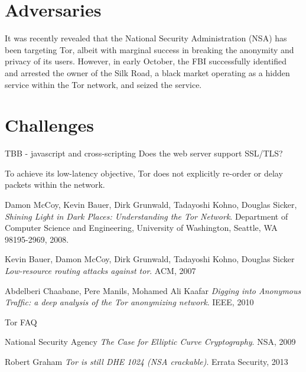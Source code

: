 \documentclass[journal]{IEEEtran}
\begin{document}

\section{Adversaries}

It was recently revealed that the National Security Administration (NSA) has been targeting Tor, albeit with marginal success in breaking the anonymity and privacy of its users. However, in early October, the FBI successfully identified and arrested the owner of the Silk Road, a black market operating as a hidden service within the Tor network, and seized the service.

\section{Challenges}

TBB - javascript and cross-scripting
Does the web server support SSL/TLS?

To achieve its low-latency objective, Tor does not explicitly re-order or delay packets within the network.\cite{McCoy2008}

\begin{thebibliography}{9}

  Damon McCoy, Kevin Bauer, Dirk Grunwald, Tadayoshi Kohno, Douglas Sicker,
  \emph{Shining Light in Dark Places: Understanding the Tor Network}.
  Department of Computer Science and Engineering,
  University of Washington, Seattle, WA 98195-2969,
  2008.

  Kevin Bauer, Damon McCoy, Dirk Grunwald, Tadayoshi Kohno, Douglas Sicker
  \emph{Low-resource routing attacks against tor}.
  ACM, 2007

  Abdelberi Chaabane, Pere Manils, Mohamed Ali Kaafar
  \emph{Digging into Anonymous Trafﬁc: a deep analysis of the Tor anonymizing network}.
  IEEE, 2010

  Tor FAQ

  National Security Agency
  \emph{The Case for Elliptic Curve Cryptography}.
  NSA, 2009

  Robert Graham
  \emph{Tor is still DHE 1024 (NSA crackable)}.
  Errata Security, 2013

\end{thebibliography}
\end{document}
